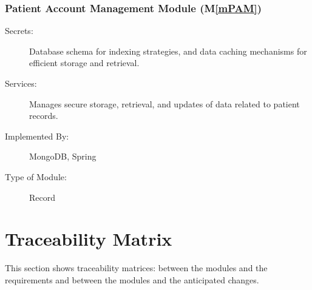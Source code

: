 \documentclass[12pt, titlepage]{article}
\newcommand{\mref}[1]{M\ref{#1}}
\begin{document}
\subsubsection{Patient Account Management Module (\mref{mPAM})}

\begin{description}
\item[Secrets:]Database schema for indexing strategies, and data caching mechanisms for efficient storage and retrieval.
\item[Services:]Manages secure storage, retrieval, and updates of data related to patient records.
\item[Implemented By:]MongoDB, Spring
\item[Type of Module:]Record
\end{description}


\section{Traceability Matrix} \label{SecTM}

This section shows traceability matrices: between the modules and the requirements and between the modules and the anticipated changes.
\end{document}
